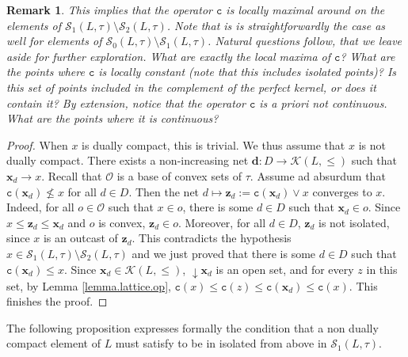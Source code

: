 \documentclass{article}
\newtheorem{remark}[theorem]{Remark}
\begin{document}
\begin{remark}
    {This implies that} the operator $\texttt{c}$ {is locally maximal around on the elements}
    of $\mathcal{S}_1(L,\tau) \setminus \mathcal{S}_2(L,\tau)$. Note that is is straightforwardly the case as well for elements of $\mathcal{S}_0(L,\tau) \setminus \mathcal{S}_1(L,\tau)$. Natural questions follow, that we leave aside for further exploration. What are exactly the local maxima of $\texttt{c}$? What are the points where $\texttt{c}$ is locally constant (note that this includes isolated points)? Is this set of points included in the complement of the perfect kernel, or does it contain it? By extension, notice that the operator $\texttt{c}$ is a priori not continuous. What are the points where it is continuous?
\end{remark}

\begin{proof}
    When $x$ is dually compact, this is trivial. We thus assume that $x$ is not dually compact. There exists a non-increasing net $\boldsymbol{d} : D \rightarrow \mathcal{K}(L,\le)$ such that $\boldsymbol{x}_d \rightarrow x$. Recall that $\mathcal{O}$ is a base of convex sets of $\tau$. Assume ad absurdum that $\texttt{c}(\boldsymbol{x}_d) \not \le x$ for all $d \in D$. Then 
    the net $d \mapsto \boldsymbol{z}_d := \texttt{c}(\boldsymbol{x}_d) \vee x$ converges to $x$. Indeed, for all $o \in \mathcal{O}$ such that $x \in o$, there is some $d \in D$ such that $\boldsymbol{x}_d \in o$. 
    Since $x \le \boldsymbol{z}_d \le \boldsymbol{x}_d$ and $o$ is convex, 
    $\boldsymbol{z}_d \in o$. Moreover, for all $d \in D$, $\boldsymbol{z}_d$ is not isolated, since $x$ is an outcast of $\boldsymbol{z}_d$. This contradicts the hypothesis $ x \in \mathcal{S}_{1}(L,\tau) \setminus \mathcal{S}_{2}(L,\tau)$ and we just proved that there is some $d \in D$
    such that $\texttt{c}(\boldsymbol{x}_d) \le x$. 
    Since $\boldsymbol{x}_d \in \mathcal{K}(L,\le)$, $\mathop{\downarrow}\boldsymbol{x}_d$ is an open set, and for every $z$ in this set, by Lemma \ref{lemma.lattice.op}, $\texttt{c}(x) \le \texttt{c}(z) \le \texttt{c}(\boldsymbol{x}_d) \le \texttt{c}(x)$. This finishes the proof.
\end{proof}

{The following proposition expresses formally the condition that a non dually compact element of $L$ must satisfy to be in isolated from above in $\mathcal{S}_1(L,\tau)$.}
\end{document}

